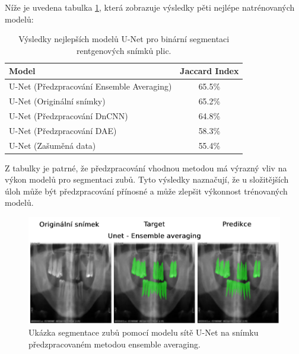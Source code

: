 \documentclass[male,czech,api_ing]{thesis}
\begin{document}
Níže je uvedena tabulka \ref{tab:MulticlassUnetResults}, která zobrazuje výsledky pěti nejlépe natrénovaných modelů:

\begin{table}[ht]
    \centering
    \begin{tabular}{|l|c|}
        \hline
        \textbf{Model}                            & \textbf{Jaccard Index} \\ \hline
        U-Net (Předzpracování Ensemble Averaging) & 65.5\%                 \\ \hline
        U-Net (Originální snímky)                 & 65.2\%                 \\ \hline
        U-Net (Předzpracování DnCNN)              & 64.8\%                 \\ \hline
        U-Net (Předzpracování DAE)                & 58.3\%                 \\ \hline
        U-Net (Zašuměná data)                     & 55.4\%                 \\ \hline
    \end{tabular}
    \caption{Výsledky nejlepších modelů U-Net pro binární segmentaci rentgenových snímků plic.}
    \label{tab:MulticlassUnetResults}
\end{table}

Z tabulky je patrné, že předzpracování vhodnou metodou má výrazný vliv na výkon modelů pro segmentaci zubů. Tyto výsledky naznačují, že u složitějších úloh může být předzpracování přínosné a může zlepšit výkonnost trénovaných modelů.

\begin{figure}[h]
    \centering
    \includegraphics[width=\linewidth]{Prilohy/Obrazky/MulticlassUnetEnsemble.png}
    \caption{Ukázka segmentace zubů pomocí modelu sítě U-Net na snímku předzpracovaném metodou ensemble averaging.}
    \label{fig:MulticlassUnet}
\end{figure}
\end{document}
